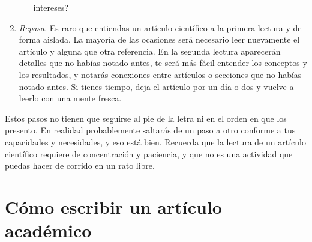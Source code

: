 \begin{enumerate}
\begin{itemize}
                    intereses?
          \end{itemize}
    \item \emph{Repasa}. Es raro que entiendas un artículo científico a la
          primera lectura y de forma aislada.
          La mayoría de las ocasiones será necesario leer nuevamente el artículo
          y alguna que otra referencia.
          En la segunda lectura aparecerán detalles que no habías notado antes,
          te será más fácil entender los conceptos y los resultados, y notarás
          conexiones entre artículos o secciones que no habías notado antes.
          Si tienes tiempo, deja el artículo por un día o dos y vuelve a leerlo
          con una mente fresca.
\end{enumerate}

Estos pasos no tienen que seguirse al pie de la letra ni en el orden en que los
presento.
En realidad probablemente saltarás de un paso a otro conforme a tus capacidades
y necesidades, y eso está bien.
Recuerda que la lectura de un artículo científico requiere de concentración y
paciencia, y que no es una actividad que puedas hacer de corrido en un rato
libre.
\section{Cómo escribir un artículo académico}
\label{sec:comoescribir}